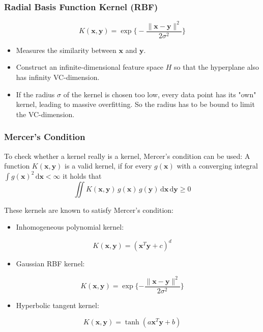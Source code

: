 \documentclass[a4paper, 11pt, accentcolor = tud3b]{tudreport}
\newcommand{\dif}[1]{\ensuremath{\,\mathrm{d}#1}}
\renewcommand{\vec}[1]{\mathbf{#1}}
\begin{document}
				\subsubsection{Radial Basis Function Kernel (RBF)}
					\begin{equation}
						K(\vec{x}, \vec{y}) = \exp\Bigg\{ -\frac{\lVert \vec{x} - \vec{y} \rVert^2}{2\sigma^2} \Bigg\}
					\end{equation}
					\begin{itemize}
						\item Measures the similarity between \(\vec{x}\) and \(\vec{y}\).
						\item Construct an infinite-dimensional feature space \(H\) so that the hyperplane also has infinity VC-dimension.
						\item If the radius \(\sigma\) of the kernel is chosen too low, every data point has its "own" kernel, leading to massive overfitting. So the radius has to be bound to limit the VC-dimension.
					\end{itemize}
				
				\subsubsection{Mercer's Condition}
					To check whether a kernel really is a kernel, Mercer's condition can be used: A function \( K(\vec{x}, \vec{y}) \) is a valid kernel, if for every \( g(\vec{x}) \) with a converging integral \( \int g(\vec{x})^2 \dif{\vec{x}} < \infty \) it holds that
					\begin{equation}
						\iint K(\vec{x}, \vec{y}) \, g(\vec{x}) \, g(\vec{y}) \dif{\vec{x}} \dif{\vec{y}} \geq 0
					\end{equation}
					
					These kernels are known to satisfy Mercer's condition:
					\begin{itemize}
						\item Inhomogeneous polynomial kernel:
					\end{itemize}
					\begin{equation}
						K(\vec{x}, \vec{y}) = (\vec{x}^T \vec{y} + c)^d
					\end{equation}
					\begin{itemize}
						\item Gaussian RBF kernel:
					\end{itemize}
					\begin{equation}
						K(\vec{x}, \vec{y}) = \exp \{ -\frac{\lVert \vec{x} - \vec{y} \rVert^2}{2\sigma^2} \}
					\end{equation}
					\begin{itemize}
						\item Hyperbolic tangent kernel:
					\end{itemize}
					\begin{equation}
						K(\vec{x}, \vec{y}) = \tanh(a\vec{x}^T \vec{y} + b)
					\end{equation}
				
\end{document}
